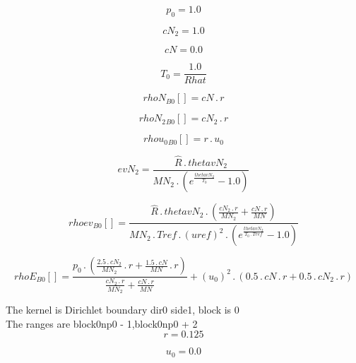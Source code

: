 \documentclass{article}
\begin{document}
\begin{dmath}p_{0} = 1.0\end{dmath}

\begin{dmath}cN_{2} = 1.0\end{dmath}

\begin{dmath}cN = 0.0\end{dmath}

\begin{dmath}T_{0} = \frac{1.0}{Rhat}\end{dmath}

\begin{dmath}{rhoN{_{B0}}}[{}] = cN \,.\, r\end{dmath}

\begin{dmath}{rhoN_{2}{_{B0}}}[{}] = cN_{2} \,.\, r\end{dmath}

\begin{dmath}{rhou_{0}{_{B0}}}[{}] = r \,.\, u_{0}\end{dmath}

\begin{dmath}evN_{2} = \frac{\hat{R} \,.\, thetavN_{2}}{MN_{2} \,.\, \left(e^{\frac{thetavN_{2}}{T_{0}}} - 1.0\right)}\end{dmath}

\begin{dmath}{rhoev{_{B0}}}[{}] = \frac{\hat{R} \,.\, thetavN_{2} \,.\, \left(\frac{cN_{2} \,.\, r}{MN_{2}} + \frac{cN \,.\, r}{MN}\right)}{MN_{2} \,.\, Tref \,.\, \left(uref \right)^{2} \,.\, \left(e^{\frac{thetavN_{2}}{T_{0} \,.\, Tref}} - 
1.0\right)}\end{dmath}

\begin{dmath}{rhoE{_{B0}}}[{}] = \frac{p_{0} \,.\, \left(\frac{2.5 \,.\, cN_{2}}{MN_{2}} \,.\, r + \frac{1.5 \,.\, cN}{MN} \,.\, r\right)}{\frac{cN_{2} \,.\, r}{MN_{2}} + \frac{cN \,.\, r}{MN}} + \left(u_{0} \right)^{2} \,.\, \left(0.5 \,.\, cN \,.\, 
r + 0.5 \,.\, cN_{2} \,.\, r\right)\end{dmath}

\noindent The kernel is Dirichlet boundary dir0 side1, block is 0\\\noindent The ranges are block0np0 - 1,block0np0 + 2\\\begin{dmath}r = 0.125\end{dmath}

\begin{dmath}u_{0} = 0.0\end{dmath}
\end{document}
